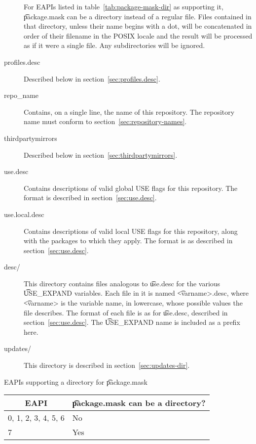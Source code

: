 \begin{description}
     For EAPIs listed in table~\ref{tab:package-mask-dir} as
    supporting it, \t{package.mask} can be a directory instead of a regular file. Files contained
    in that directory, unless their name begins with a dot, will be concatenated in order of their
    filename in the POSIX locale and the result will be processed as if it were a single file.
    Any subdirectories will be ignored.
\item[profiles.desc] Described below in section~\ref{sec:profiles.desc}.
\item[repo_name] Contains, on a single line, the name of this repository. The repository name must
    conform to section~\ref{sec:repository-names}.
\item[thirdpartymirrors] Described below in section~\ref{sec:thirdpartymirrors}.
\item[use.desc] Contains descriptions of valid global USE flags for this repository. The format is
    described in section~\ref{sec:use.desc}.
\item[use.local.desc] Contains descriptions of valid local USE flags for this repository, along with
    the packages to which they apply. The format is as described in section~\ref{sec:use.desc}.
\item[desc/] This directory contains files analogous to \t{use.desc} for the various \t{USE_EXPAND}
    variables. Each file in it is named \t{<varname>.desc}, where \t{<varname>} is the variable
    name, in lowercase, whose possible values the file describes. The format of each file is as for
    \t{use.desc}, described in section~\ref{sec:use.desc}. The \t{USE_EXPAND} name is 
    included as a prefix here.
\item[updates/] This directory is described in section~\ref{sec:updates-dir}.
\end{description}

\begin{centertable}{EAPIs supporting a directory for \t{package.mask}}
    \label{tab:package-mask-dir}
    \begin{tabular}{ll}
      \toprule
      \multicolumn{1}{c}{\textbf{EAPI}} &
      \multicolumn{1}{c}{\textbf{\t{package.mask} can be a directory?}} \\
      \midrule
      0, 1, 2, 3, 4, 5, 6 & No  \\
      7                   & Yes \\
      \bottomrule
    \end{tabular}
\end{centertable}

